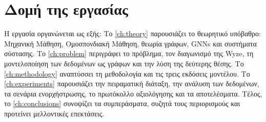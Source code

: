 \section{Δομή της εργασίας}\label{sec:intro-structure}
Η εργασία οργανώνεται ως εξής: Το \autoref{ch:theory} παρουσιάζει το θεωρητικό υπόβαθρο: Μηχανική Μάθηση, Ομοσπονδιακή Μάθηση, θεωρία γράφων, GNNs και συστήματα σύστασης. Το \autoref{ch:problem} περιγράφει το πρόβλημα, τον διαγωνισμό της Wyze, τη μοντελοποίηση των δεδομένων ως γράφων και την λύση της δεύτερης θέσης. Το \autoref{ch:methodology} αναπτύσσει τη μεθοδολογία και τις τρεις εκδόσεις μοντέλου. Το \autoref{ch:experiments} παρουσιάζει την πειραματική διάταξη, την ανάλυση των δεδομένων, τα σενάρια ενορχήστρωσης, το πρωτόκολλο αξιολόγησης και τα αποτελέσματα. Τέλος, το \autoref{ch:conclusions} συνοψίζει τα συμπεράσματα, συζητά τους περιορισμούς και προτείνει μελλοντικές επεκτάσεις.
